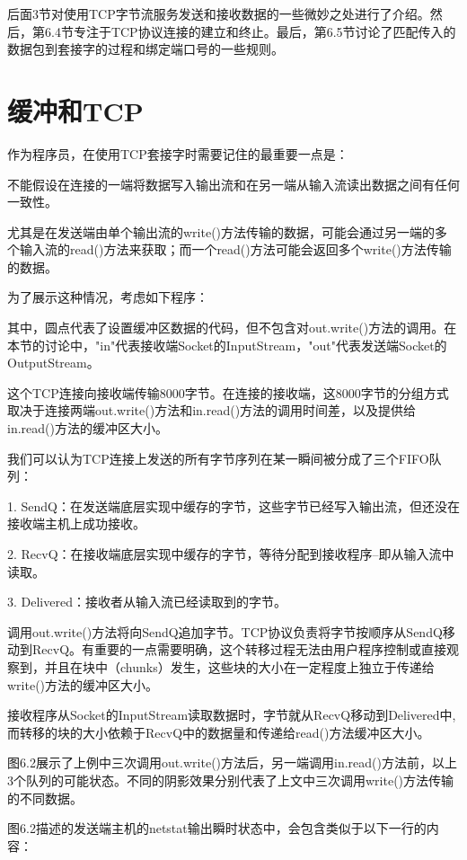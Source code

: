 	后面3节对使用TCP字节流服务发送和接收数据的一些微妙之处进行了介绍。然后，第6.4节专注于TCP协议连接的建立和终止。最后，第6.5节讨论了匹配传入的数据包到套接字的过程和绑定端口号的一些规则。

\section{缓冲和TCP}

	作为程序员，在使用TCP套接字时需要记住的最重要一点是：

	不能假设在连接的一端将数据写入输出流和在另一端从输入流读出数据之间有任何一致性。

	尤其是在发送端由单个输出流的write()方法传输的数据，可能会通过另一端的多个输入流的read()方法来获取；而一个read()方法可能会返回多个write()方法传输的数据。

	为了展示这种情况，考虑如下程序：

	

	其中，圆点代表了设置缓冲区数据的代码，但不包含对out.write()方法的调用。在本节的讨论中，"in"代表接收端Socket的InputStream，"out"代表发送端Socket的OutputStream。

	这个TCP连接向接收端传输8000字节。在连接的接收端，这8000字节的分组方式取决于连接两端out.write()方法和in.read()方法的调用时间差，以及提供给in.read()方法的缓冲区大小。

	我们可以认为TCP连接上发送的所有字节序列在某一瞬间被分成了三个FIFO队列：

	1. SendQ：在发送端底层实现中缓存的字节，这些字节已经写入输出流，但还没在接收端主机上成功接收。

	2. RecvQ：在接收端底层实现中缓存的字节，等待分配到接收程序--即从输入流中读取。

	3. Delivered：接收者从输入流已经读取到的字节。

	调用out.write()方法将向SendQ追加字节。TCP协议负责将字节按顺序从SendQ移动到RecvQ。有重要的一点需要明确，这个转移过程无法由用户程序控制或直接观察到，并且在块中（chunks）发生，这些块的大小在一定程度上独立于传递给write()方法的缓冲区大小。

	接收程序从Socket的InputStream读取数据时，字节就从RecvQ移动到Delivered中,而转移的块的大小依赖于RecvQ中的数据量和传递给read()方法缓冲区大小。

	图6.2展示了上例中三次调用out.write()方法后，另一端调用in.read()方法前，以上3个队列的可能状态。不同的阴影效果分别代表了上文中三次调用write()方法传输的不同数据。

	图6.2描述的发送端主机的netstat输出瞬时状态中，会包含类似于以下一行的内容：

